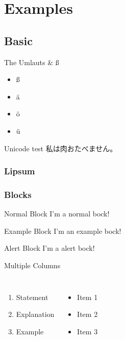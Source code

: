 \section{Examples}
\subsection{Basic}

\begin{frame}{The Umlauts & ß}
	\begin{itemize}
		\item ß
		\item ä
		\item ö
		\item ü
	\end{itemize}
\end{frame}
\begin{frame}{Unicode test}
	\centering
	私は肉おたべません。
\end{frame}

\begin{frame}
	\frametitle{Lipsum}
	\centering
	\lipsum[1]
\end{frame}

\begin{frame}
	\frametitle{Blocks}
	\begin{block}{Normal Block}
		I'm a normal bock!
	\end{block}
	\begin{exampleblock}{Example Block}
		I'm an example bock!
	\end{exampleblock}
	\begin{alertblock}{Alert Block}
		I'm a alert bock!
	\end{alertblock}
\end{frame}

\begin{frame}{Multiple Columns}
    \begin{columns}[c]
        \begin{enumerate}
            \item Statement
            \item Explanation
            \item Example
        \end{enumerate}

        \begin{itemize}
			\item Item 1
			\item Item 2
			\item Item 3
		\end{itemize}

    \end{columns}
\end{frame}

